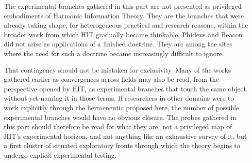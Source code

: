 The experimental branches gathered in this part are not presented as privileged embodiments of Harmonic Information Theory. They are the branches that were already taking shape, for heterogeneous practical and research reasons, within the broader work from which HIT gradually became thinkable. Phideus and Beacon did not arise as applications of a finished doctrine. They are among the sites where the need for such a doctrine became increasingly difficult to ignore.

That contingency should not be mistaken for exclusivity. Many of the works gathered earlier as convergences across fields may also be read, from the perspective opened by HIT, as experimental branches that touch the same object without yet naming it in those terms. If researchers in other domains were to work explicitly through the hermeneutic proposed here, the number of possible experimental branches would have no obvious closure. The probes gathered in this part should therefore be read for what they are: not a privileged map of HIT's experimental horizon, and not anything like an exhaustive survey of it, but a first cluster of situated exploratory fronts through which the theory begins to undergo explicit experimental testing.
